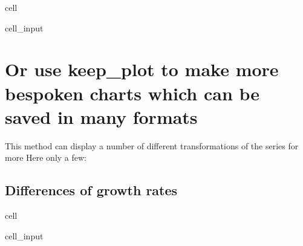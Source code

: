 \documentclass[letterpaper,10pt,english]{jupyterBook}
\begin{document}
\sphinxAtStartPar
{}

\begin{sphinxuseclass}{cell}\begin{sphinxVerbatimInput}

\begin{sphinxuseclass}{cell_input}
\begin{sphinxVerbatim}[commandchars=\\\{\}]
\PYG{p}{[}\PYG{p}{]}
\end{sphinxVerbatim}

\end{sphinxuseclass}\end{sphinxVerbatimInput}

\end{sphinxuseclass}

\section{Or use keep\_plot to make more bespoken charts which can be saved  in many formats}
\label{\detokenize{content/06_WBModels/LoadingWBModel:or-use-keep-plot-to-make-more-bespoken-charts-which-can-be-saved-in-many-formats}}
\sphinxAtStartPar
This method can display a number of different transformations of the series for more 
Here only a few:


\subsection{Differences of growth rates}
\label{\detokenize{content/06_WBModels/LoadingWBModel:differences-of-growth-rates}}
\begin{sphinxuseclass}{cell}\begin{sphinxVerbatimInput}

\begin{sphinxuseclass}{cell_input}
\begin{sphinxVerbatim}[commandchars=\\\{\}]
\end{sphinxVerbatim}

\end{sphinxuseclass}\end{sphinxVerbatimInput}

\end{sphinxuseclass}
\end{document}
